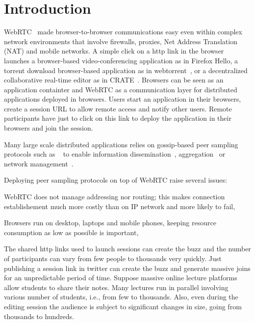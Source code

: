 
\section{Introduction}


WebRTC~\cite{webrtc} made browser-to-browser communications easy even
within complex network environments that involve firewalls, proxies,
Net Address Translation (NAT) and mobile networks. A simple click on a
http link in the browser launches a browser-based video-conferencing
application as in Firefox Hello, a torrent download browser-based application as in
webtorrent~\cite{webtorrent}, or a decentralized collaborative
real-time editor as in CRATE~\cite{nedelec2016crate}. Browsers can be
seen as an application containter and WebRTC as a communication layer
for distributed applications deployed in browsers. Users start an
application in their browsers, create a session URL to allow remote
access and notify other users. Remote participants have just to click
on this link to deploy the application in their browsers and join the session.

Many large scale distributed applications relies on gossip-based peer
sampling protocols such as \CYCLON~\cite{voulgaris2005cyclon} to
enable information dissemination~\cite{eugster2003lightweight,
  tolgyeski2009adaptive}, aggregation~\cite{jelasity2004epidemic} or
network management~\cite{jelasity2009tman, voulgaris2005epidemic}.

Deploying peer sampling protocols on top of WebRTC raise several issues:
\begin{inparaenum}[(1)]
\item WebRTC does not manage addressing nor routing; this makes
  connection establishement much more costly than on IP network and
  more likely to fail,
\item Browsers run on desktop, laptops and mobile phones, keeping
  resource consumption as low as possible is important,
\item The shared http links used to launch sessions can create the
  buzz and the number of participants can vary from few people to
  thousands very quickly. Just publishing a session link in twitter
  can create the buzz and generate massive joins for an unpredictable
  period of time. Suppose massive online lecture platforms allow
  students to share their notes. Many lectures run in parallel
  involving various number of students, i.e., from few to
  thousands. Also, even during the editing session the audience is
  subject to significant changes in size, going from thousands to
  hundreds. 
\end{inparaenum}

